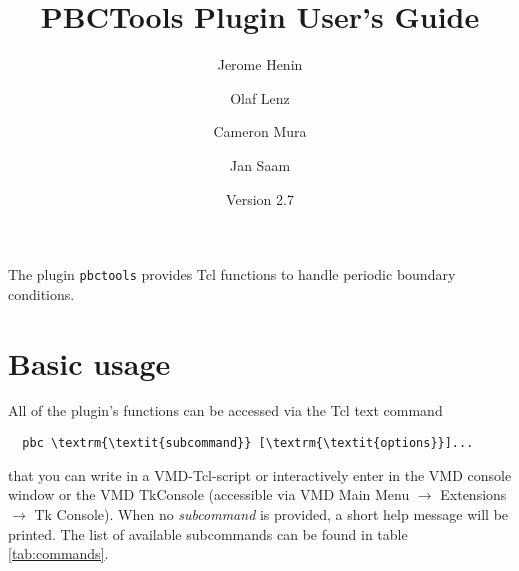\documentclass[a4paper, DIV12]{scrartcl}
\newcommand{\pbctools}{PBCTools\xspace}
\begin{document}
\title{\pbctools Plugin User's Guide}
\author{Jerome Henin \and Olaf Lenz \and Cameron Mura \and Jan Saam}
\date{Version 2.7}

\maketitle

The plugin \texttt{pbctools} provides Tcl functions to handle periodic
boundary conditions. 

\section{Basic usage}
All of the plugin's functions can be accessed via the Tcl text command

\begin{Verbatim}
  pbc \textrm{\textit{subcommand}} [\textrm{\textit{options}}]...
\end{Verbatim}

\noindent that you can write in a VMD-Tcl-script or interactively
enter in the VMD console window or the VMD TkConsole (accessible via
VMD Main Menu $\rightarrow$ Extensions $\rightarrow$ Tk Console).
When no \textit{subcommand} is provided, a short help message will be
printed. The list of available subcommands can be found in table
\ref{tab:commands}.
\end{document}
